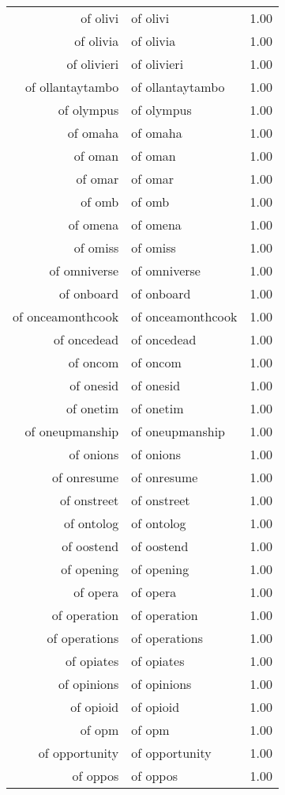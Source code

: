 \begin{table}[ht]
\begin{tabular}{rlr}
  of olivi & of olivi & 1.00 \\ 
  of olivia & of olivia & 1.00 \\ 
  of olivieri & of olivieri & 1.00 \\ 
  of ollantaytambo & of ollantaytambo & 1.00 \\ 
  of olympus & of olympus & 1.00 \\ 
  of omaha & of omaha & 1.00 \\ 
  of oman & of oman & 1.00 \\ 
  of omar & of omar & 1.00 \\ 
  of omb & of omb & 1.00 \\ 
  of omena & of omena & 1.00 \\ 
  of omiss & of omiss & 1.00 \\ 
  of omniverse & of omniverse & 1.00 \\ 
  of onboard & of onboard & 1.00 \\ 
  of onceamonthcook & of onceamonthcook & 1.00 \\ 
  of oncedead & of oncedead & 1.00 \\ 
  of oncom & of oncom & 1.00 \\ 
  of onesid & of onesid & 1.00 \\ 
  of onetim & of onetim & 1.00 \\ 
  of oneupmanship & of oneupmanship & 1.00 \\ 
  of onions & of onions & 1.00 \\ 
  of onresume & of onresume & 1.00 \\ 
  of onstreet & of onstreet & 1.00 \\ 
  of ontolog & of ontolog & 1.00 \\ 
  of oostend & of oostend & 1.00 \\ 
  of opening & of opening & 1.00 \\ 
  of opera & of opera & 1.00 \\ 
  of operation & of operation & 1.00 \\ 
  of operations & of operations & 1.00 \\ 
  of opiates & of opiates & 1.00 \\ 
  of opinions & of opinions & 1.00 \\ 
  of opioid & of opioid & 1.00 \\ 
  of opm & of opm & 1.00 \\ 
  of opportunity & of opportunity & 1.00 \\ 
  of oppos & of oppos & 1.00 \\ 

\end{tabular}
\end{table}
